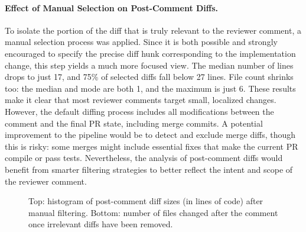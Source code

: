 \paragraph{Effect of Manual Selection on Post-Comment Diffs.}
To isolate the portion of the diff that is truly relevant to the reviewer comment, a manual
selection process was applied. Since it is both possible and strongly encouraged to specify the
precise diff hunk corresponding to the implementation change, this step yields a much more focused
view. The median number of lines drops to just 17, and 75\% of selected diffs fall below 27 lines.
File count shrinks too: the median and mode are both 1, and the maximum is just 6. These results
make it clear that most reviewer comments target small, localized changes. However, the default
diffing process includes all modifications between the comment and the final PR state, including
merge commits. A potential improvement to the pipeline would be to detect and exclude merge diffs,
though this is risky: some merges might include essential fixes that make the current PR compile or
pass tests. Nevertheless, the analysis of post-comment diffs would benefit from smarter filtering
strategies to better reflect the intent and scope of the reviewer comment.

\begin{figure}[!htbp]
	\centering

	\vspace{1em}


	\caption{Top: histogram of post-comment diff sizes (in lines of code) after manual filtering. Bottom: number of files changed after the comment once irrelevant diffs have been removed.}
	\label{fig:diff-after-filtered}
\end{figure}
\FloatBarrier

